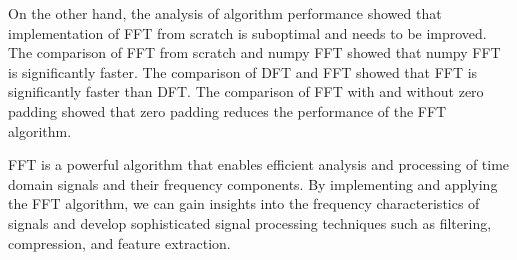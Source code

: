 \documentclass[a4paper,12pt,fleqn]{article}
\begin{document}
On the other hand, the analysis of algorithm performance showed that implementation of FFT from scratch is suboptimal and needs to be improved. The comparison of FFT from scratch and numpy FFT showed that numpy FFT is significantly faster. The comparison of DFT and FFT showed that FFT is significantly faster than DFT. The comparison of FFT with and without zero padding showed that zero padding reduces the performance of the FFT algorithm.

FFT is a powerful algorithm that enables efficient analysis and processing of time domain signals and
their frequency components. By implementing and applying the FFT algorithm, we can gain insights into the frequency characteristics of signals and develop sophisticated signal processing techniques such as filtering, compression, and feature extraction.
\end{document}
